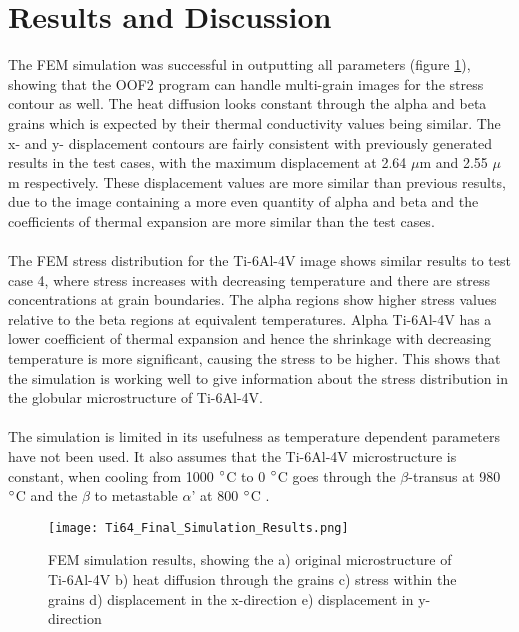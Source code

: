 \documentclass[report.tex]{subfiles}
\begin{document}
\section{Results and Discussion}

The FEM simulation was successful in outputting all parameters (figure \ref{fig:FinalSimulationResults}), showing that the OOF2 program can handle multi-grain images for the stress contour as well. The heat diffusion looks constant through the alpha and beta grains which is expected by their thermal conductivity values being similar. The x- and y- displacement contours are fairly consistent with previously generated results in the test cases, with the maximum displacement at 2.64 $\mu$m and 2.55 $\mu$m respectively. These displacement values are more similar than previous results, due to the image containing a more even quantity of alpha and beta and the coefficients of thermal expansion are more similar than the test cases.\\
\\ 
The FEM stress distribution for the Ti-6Al-4V image shows similar results to test case 4, where  stress increases with decreasing temperature and there are stress concentrations at grain boundaries. The alpha regions show higher stress values relative to the beta regions at equivalent temperatures. Alpha Ti-6Al-4V has a lower coefficient of thermal expansion and hence the shrinkage with decreasing temperature is more significant, causing the stress to be higher. This shows that the simulation is working well to give information about the stress distribution in the globular microstructure of Ti-6Al-4V.\\
\\
The simulation is limited in its usefulness as temperature dependent parameters have not been used. It also assumes that the Ti-6Al-4V microstructure is constant, when cooling from 1000 $\degree$C to 0 $\degree$C goes through the $\beta$-transus at 980 $\degree$C and the $\beta$ to metastable $\alpha$' at 800 $\degree$C \cite{Ti64PhaseDiagram}.

\begin{figure}[h!]
    \centering
    \texttt{[image: Ti64\_Final\_Simulation\_Results.png]}
    \caption{FEM simulation results, showing the a) original microstructure of Ti-6Al-4V b) heat diffusion through the grains c) stress    within the grains d) displacement in the x-direction e) displacement in y-direction}
    \label{fig:FinalSimulationResults}
\end{figure}
\end{document}
